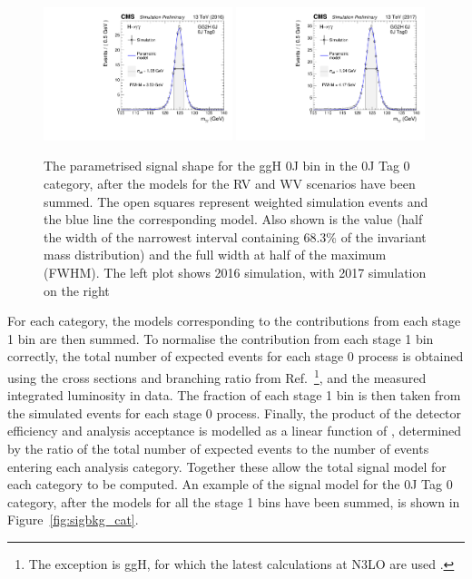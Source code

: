 \begin{figure}[hptb]
  \centering
  \includegraphics[width=0.49\textwidth]{Figures/SigBkg/GG2H_0J_RECO_0J_Tag0_2016.pdf}
  \includegraphics[width=0.49\textwidth]{Figures/SigBkg/GG2H_0J_RECO_0J_Tag0_2017.pdf}
  \caption[Signal model for the ggH 0J bin in the 0J Tag 0 category.]
  {
    The parametrised signal shape for the ggH 0J bin in the 0J Tag 0 category, 
    after the models for the RV and WV scenarios have been summed.
    The open squares represent weighted simulation events and the blue line the
    corresponding model. Also shown is the \seff value (half the width of the narrowest interval
    containing 68.3\% of the invariant mass distribution) and the full width at half of the maximum
    (FWHM). The left plot shows 2016 simulation, with 2017 simulation on the right
  }
  \label{fig:sigbkg_proccat}
\end{figure}

For each category, 
the models corresponding to the contributions from each stage 1 bin are then summed.
To normalise the contribution from each stage 1 bin correctly, 
the total number of expected events for each stage 0 process is obtained 
using the cross sections and \Hgg branching ratio from Ref.~\cite{YR4}\footnote{The exception is ggH, 
for which the latest calculations at N3LO are used \cite{Anastasiou2015,Anastasiou2016}.},
and the measured integrated luminosity in data.
The fraction of each stage 1 bin is then taken from the simulated events for each stage 0 process.
Finally, the product of the detector efficiency and analysis acceptance 
is modelled as a linear function of \mH, 
determined by the ratio of the total number of expected events 
to the number of events entering each analysis category.
Together these allow the total signal model for each category to be computed.
An example of the signal model for the 0J Tag 0 category, 
after the models for all the stage 1 bins have been summed, 
is shown in Figure~\ref{fig:sigbkg_cat}.

